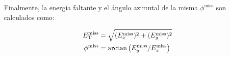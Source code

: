 Finalmente, la energía faltante {\met} y el ángulo azimutal de la misma
$\phi^\mathrm{miss}$ son calculados como:

\begin{align}
  E_{\mathrm{T}}^{\mathrm{miss}} &= \sqrt{ (E^{\mathrm{miss}}_x)^2 + (E^{\mathrm{miss}}_y)^2 } \\
  \phi^{\mathrm{miss}} &= \arctan \left( E^{\mathrm{miss}}_y / E^{\mathrm{miss}}_x \right)
\end{align}
